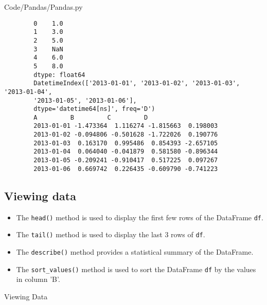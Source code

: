 \begin{code}[h!]
	 {Code/Pandas/Pandas.py}
\end{code}

	\begin{verbatim}
		0    1.0
		1    3.0
		2    5.0
		3    NaN
		4    6.0
		5    8.0
		dtype: float64
		DatetimeIndex(['2013-01-01', '2013-01-02', '2013-01-03', '2013-01-04',
		'2013-01-05', '2013-01-06'],
		dtype='datetime64[ns]', freq='D')
		A         B         C         D
		2013-01-01 -1.473364  1.116274 -1.815663  0.198003
		2013-01-02 -0.094806 -0.501628 -1.722026  0.190776
		2013-01-03  0.163170  0.995486  0.854393 -2.657105
		2013-01-04  0.064040 -0.041879  0.581580 -0.896344
		2013-01-05 -0.209241 -0.910417  0.517225  0.097267
		2013-01-06  0.669742  0.226435 -0.609790 -0.741223
	\end{verbatim}

	\subsection{Viewing data}
	
	\begin{itemize}
		
		\item The \texttt{head()} method is used to display the first few rows of the DataFrame \texttt{df}.
		
		\item The \texttt{tail()} method is used to display the last 3 rows of \texttt{df}.
		
		\item The \texttt{describe()} method provides a statistical summary of the DataFrame.
		
		\item The \texttt{sort\_values()} method is used to sort the DataFrame \texttt{df} by the values in column 'B'.
		
	\end{itemize}
	
		\begin{code}[h!]
		    
		
		\caption{Viewing Data}
		
		\end{code}

